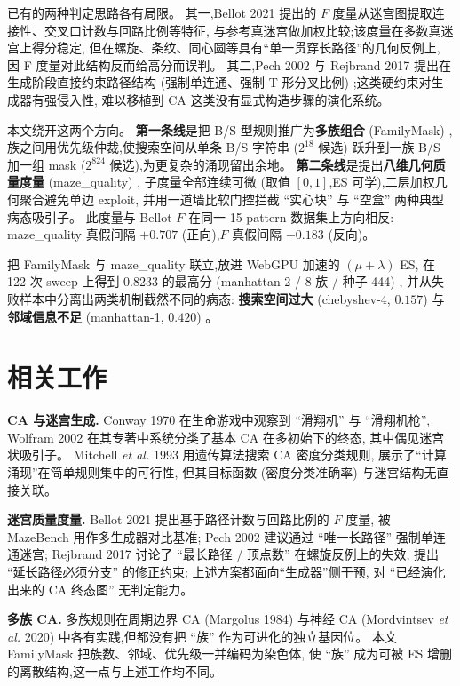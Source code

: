 \documentclass[11pt,a4paper]{article}
\begin{document}
已有的两种判定思路各有局限。
其一,Bellot 2021 提出的 $F$ 度量从迷宫图提取连接性、交叉口计数与回路比例等特征,
与参考真迷宫做加权比较;该度量在多数真迷宫上得分稳定,
但在螺旋、条纹、同心圆等具有``单一贯穿长路径''的几何反例上,
因 F 度量对此结构反而给高分而误判。
其二,Pech 2002 与 Rejbrand 2017 提出在生成阶段直接约束路径结构
(强制单连通、强制 T 形分叉比例) ;这类硬约束对生成器有强侵入性,
难以移植到 CA 这类没有显式构造步骤的演化系统。

本文绕开这两个方向。
\textbf{第一条线}是把 B/S 型规则推广为\textbf{多族组合} (FamilyMask) ,
族之间用优先级仲裁,使搜索空间从单条 B/S 字符串 ($2^{18}$ 候选)
跃升到一族 B/S 加一组 mask ($2^{824}$ 候选),为更复杂的涌现留出余地。
\textbf{第二条线}是提出\textbf{八维几何质量度量} (maze\_quality) ,
子度量全部连续可微 (取值 $[0,1]$,ES 可学),二层加权几何聚合避免单边 exploit,
并用一道墙比软门控拦截 ``实心块'' 与 ``空盒'' 两种典型病态吸引子。
此度量与 Bellot $F$ 在同一 15-pattern 数据集上方向相反:
maze\_quality 真假间隔 $+0.707$ (正向),$F$ 真假间隔 $-0.183$ (反向)。

把 FamilyMask 与 maze\_quality 联立,放进 WebGPU 加速的 $(\mu+\lambda)$ ES,
在 122 次 sweep 上得到 0.8233 的最高分 (manhattan-2 / 8 族 / 种子 444) ,
并从失败样本中分离出两类机制截然不同的病态:
\textbf{搜索空间过大} (chebyshev-4, $0.157$) 与
\textbf{邻域信息不足} (manhattan-1, $0.420$) 。

\section{相关工作}
\textbf{CA 与迷宫生成.}
Conway 1970 在生命游戏中观察到 ``滑翔机'' 与 ``滑翔机枪'',
Wolfram 2002 在其专著中系统分类了基本 CA 在多初始下的终态,
其中偶见迷宫状吸引子。
Mitchell \textit{et al.} 1993 用遗传算法搜索 CA 密度分类规则,
展示了``计算涌现''在简单规则集中的可行性,
但其目标函数 (密度分类准确率) 与迷宫结构无直接关联。

\textbf{迷宫质量度量.}
Bellot 2021 提出基于路径计数与回路比例的 $F$ 度量,
被 MazeBench 用作多生成器对比基准;
Pech 2002 建议通过 ``唯一长路径'' 强制单连通迷宫;
Rejbrand 2017 讨论了 ``最长路径 / 顶点数'' 在螺旋反例上的失效,
提出 ``延长路径必须分支'' 的修正约束;
上述方案都面向``生成器''侧干预,
对 ``已经演化出来的 CA 终态图'' 无判定能力。

\textbf{多族 CA.}
多族规则在周期边界 CA (Margolus 1984) 与神经 CA (Mordvintsev \textit{et al.} 2020)
中各有实践,但都没有把 ``族'' 作为可进化的独立基因位。
本文 FamilyMask 把族数、邻域、优先级一并编码为染色体,
使 ``族'' 成为可被 ES 增删的离散结构,这一点与上述工作均不同。
\end{document}
